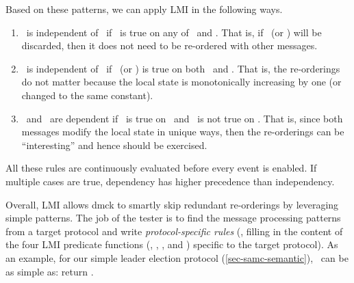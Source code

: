 Based on these patterns, we can  apply LMI in the following
ways.
\begin{enumerate}
\item \mx\ is independent of \my\ if \pd\ is true on any of \mx\ and \my.
That is, if \mx\ (or \my) will be discarded, 
then it does not need to be re-ordered 
with other messages.
%
\item \mx\ is independent of \my\ if \pi\ (or \pc) is true on both \mx\ and \my.
That is, the re-orderings do not matter because the local state is
monotonically increasing by one (or changed to the same constant).
%
\item \mx\ and \my\ are dependent if \pm\ is true on \mx\ and 
\pd\ is not true on \my.  
That is, since both messages modify the local state in unique ways, then the
re-orderings can be ``interesting'' and hence should be exercised.
%
\end{enumerate}
All these rules are continuously evaluated before every event is
enabled.  If multiple cases are true, dependency has higher precedence
than independency.








Overall, LMI allows dmck to smartly skip redundant re-orderings by
leveraging simple patterns.  The job of the tester is to find the
message processing patterns from a target protocol and write {\em
protocol-specific rules} (\ie, filling in the content of the four LMI
predicate functions (\pd, \pi, \pc, and \pm) specific to the target
protocol).  As an example, for our simple leader election protocol
(\sec\ref{sec-samc-semantic}), \pd\ can be as simple as:
return  \ts{<}
.



